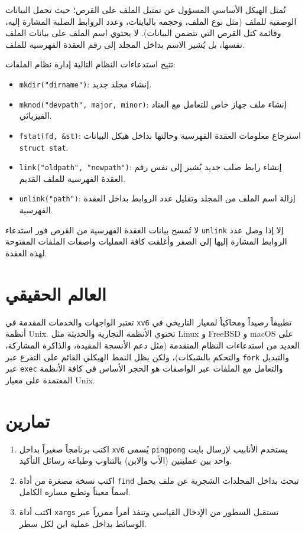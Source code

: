 تُمثل  الهيكل الأساسي المسؤول عن تمثيل الملف على القرص؛
حيث تحمل البيانات الوصفية للملف (مثل نوع الملف، وحجمه بالبايتات، وعدد الروابط الصلبة المشارة إليه، وقائمة كتل القرص التي تتضمن البيانات).
لا يحتوي اسم الملف على بيانات الملف نفسها، بل يُشير الاسم بداخل المجلد إلى رقم العقدة الفهرسية للملف.

تتيح استدعاءات النظام التالية إدارة نظام الملفات:
\begin{itemize}
\item \texttt{mkdir("dirname")}: إنشاء مجلد جديد.
\item \texttt{mknod("devpath", major, minor)}: إنشاء ملف جهاز خاص للتعامل مع العتاد الفيزيائي.
\item \texttt{fstat(fd, \&st)}: استرجاع معلومات العقدة الفهرسية وحالتها بداخل هيكل البيانات \texttt{struct stat}.
\item \texttt{link("oldpath", "newpath")}: إنشاء رابط صلب جديد يُشير إلى نفس رقم العقدة الفهرسية للملف القديم.
\item \texttt{unlink("path")}: إزالة اسم الملف من المجلد وتقليل عدد الروابط بداخل العقدة الفهرسية.
\end{itemize}

لا تُمسح بيانات العقدة الفهرسية من القرص فور استدعاء \texttt{unlink} إلا إذا وصل عدد الروابط المشارة إليها إلى الصفر وأغلقت كافة العمليات واصفات الملفات المفتوحة لهذه العقدة.

\section{العالم الحقيقي}

تعتبر الواجهات والخدمات المقدمة في \texttt{xv6} تطبيقاً رصيداً ومحاكياً لمعيار  التاريخي في أنظمة Unix.
تحتوي الأنظمة التجارية والحديثة مثل Linux و FreeBSD و macOS على العديد من استدعاءات النظام المتقدمة (مثل دعم الأنسجة المقيدة، والذاكرة المشاركة، والتحكم بالشبكات)،
ولكن يظل النمط الهيكلي القائم على التفرع عبر \texttt{fork} والتبديل عبر \texttt{exec} والتعامل مع الملفات عبر الواصفات هو الحجر الأساس في كافة الأنظمة المعتمدة على معيار Unix.

\section{تمارين}

\begin{enumerate}
\item اكتب برنامجاً صغيراً بداخل \texttt{xv6} يُسمى \texttt{pingpong} يستخدم الأنابيب لإرسال بايت واحد بين عمليتين (الأب والابن) بالتناوب وطباعة رسائل التأكيد.
\item اكتب نسخة مصغرة من أداة \texttt{find} تبحث بداخل المجلدات الشجرية عن ملف يحمل اسماً معيناً وتطبع مساره الكامل.
\item اكتب أداة \texttt{xargs} تستقبل السطور من الإدخال القياسي وتنفذ أمراً ممرراً عبر الوسائط بداخل عملية ابن لكل سطر.
\end{enumerate}
